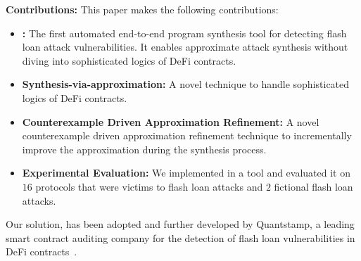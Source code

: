 \noindent \textbf{Contributions:}
This paper makes the following contributions:
\begin{itemize}[leftmargin=*]
\item \textbf{\name:} The first automated
end-to-end program synthesis tool for detecting flash loan attack
vulnerabilities. It enables approximate attack synthesis 
without diving into sophisticated logics of DeFi contracts. 
\item \textbf{Synthesis-via-approximation:} A novel  technique to handle sophisticated logics of DeFi contracts. 
\item \textbf{Counterexample Driven Approximation Refinement:} A novel counterexample driven approximation refinement technique to
        incrementally improve the approximation during the synthesis process.
\item \textbf{Experimental Evaluation:} 
We implemented {\name} in a tool and evaluated it on $16$ protocols that were victims to flash
loan attacks and $2$ fictional flash loan attacks. 
\end{itemize}

Our solution, {\name} has been adopted and further developed by Quantstamp, a leading smart contract auditing company for the detection of flash loan vulnerabilities in DeFi contracts~\cite{adoption,adoptionNews1,adoptionNews2}. 
